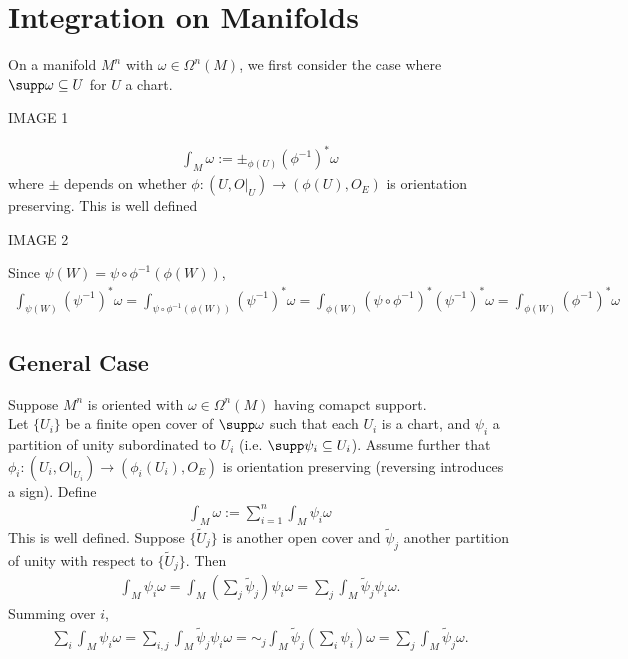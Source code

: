 \documentclass[11pt]{article}
\begin{document}
\section*{Integration on Manifolds}
\label{sec:org4cd4101}
On a manifold \(M^{n}\) with \(\omega\in\Omega^{n}(M)\), we first consider the case where \(\supp\omega\subseteq U\) for \(U\) a chart.\\
\begin{center}
IMAGE 1\\
\end{center}
\begin{align*}
  \int_{M}\omega:=
  \pm_{\phi(U)}(\phi^{-1})^{*}\omega
\end{align*}
where \(\pm\) depends on whether \(\phi:(U,O|_{U})\to(\phi(U),O_{E})\) is orientation preserving. This is well defined\\
\begin{center}
IMAGE 2\\
\end{center}
Since \(\psi(W)=\psi\circ\phi^{-1}(\phi(W))\),\\
\begin{align*}
  \int_{\psi(W)}(\psi^{-1})^{*}\omega
  =\int_{\psi\circ\phi^{-1}(\phi(W))}(\psi^{-1})^{*}\omega
  =\int_{\phi(W)}(\psi\circ\phi^{-1})^{*}(\psi^{-1})^{*}\omega
  =\int_{\phi(W)}(\phi^{-1})^{*}\omega
\end{align*}
\subsection*{General Case}
\label{sec:org1bb065e}
Suppose \(M^{n}\) is oriented with \(\omega\in\Omega^{n}(M)\) having comapct support.\\
Let \(\{U_{i}\}\) be a finite open cover of \(\supp\omega\) such that each \(U_{i}\) is a chart, and \(\psi_{i}\) a partition of unity subordinated to \(U_{i}\) (i.e. \(\supp\psi_{i}\subseteq U_{i}\)). Assume further that \(\phi_{i}:(U_{i},O|_{U_{i}})\to(\phi_{i}(U_{i}),O_{E})\) is orientation preserving (reversing introduces a sign). Define\\
\begin{align*}
  \int_{M}\omega
  :=\sum_{i=1}^{n}\int_{M}\psi_{i}\omega
\end{align*}
This is well defined. Suppose \(\{\tilde{U}_{j}\}\) is another open cover and \(\tilde{\psi}_{j}\) another partition of unity with respect to \(\{\tilde{U}_{j}\}\). Then\\
\begin{align*}
  \int_{M}\psi_{i}\omega
  =\int_{M}\left( \sum_{j}\tilde{\psi}_{j} \right)\psi_{i}\omega
  =\sum_{j}\int_{M}\tilde{\psi}_{j}\psi_{i}\omega.
\end{align*}
Summing over \(i\),\\
\begin{align*}
  \sum_{i}\int_{M}\psi_{i}\omega
  =\sum_{i,j}\int_{M}\tilde{\psi}_{j}\psi_{i}\omega
  =\sim_{j}\int_{M}\tilde{\psi}_{j}\left( \sum_{i}\psi_{i} \right)\omega
  =\sum_{j}\int_{M}\tilde{\psi}_{j}\omega.
\end{align*}
\end{document}
